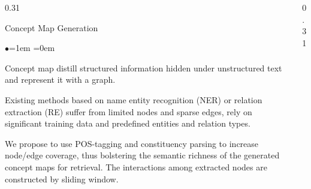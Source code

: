 \documentclass[serif,onlymath,final,xcolor=table]{beamer}
\begin{document}
\begin{frame}
\begin{columns}[t]
\begin{column}{0.31\linewidth}
\begin{block}{Concept Map Generation}
\begin{list}{$\bullet$}{\leftmargin=1em \itemindent=0em}
\item Concept map distill structured information hidden under unstructured text and represent it with a graph.
\item Existing methods based on name entity recognition (NER) or relation extraction (RE) suffer from limited nodes and sparse edges, rely on significant training data and predefined entities and relation types.
\item We propose to use POS-tagging and constituency parsing to increase node/edge coverage, thus bolstering the semantic richness of the generated concept maps for retrieval. The interactions among extracted nodes are constructed by sliding window. 
\end{list}
\end{block}


\end{column}

\begin{column}{0.31\linewidth}


\end{column}
\end{columns}
\end{frame}
\end{document}
